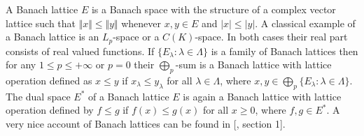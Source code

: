 A Banach lattice $E$ is a Banach space with the structure of a complex vector
lattice such that $\Vert x\Vert\leq \Vert y\Vert$ whenever $x, y\in E$ 
and $|x|\leq |y|$. A classical example of a Banach lattice is an $L_p$-space 
or a $C(K)$-space. In both cases their real part consists of real 
valued functions. If $ \{E_\lambda:\lambda\in\Lambda \}$ is a family 
of Banach lattices then for any $1\leq p\leq +\infty$ or $p=0$ 
their $\bigoplus_p$-sum is a Banach lattice with lattice operation defined 
as $x\leq y$ if $x_\lambda\leq y_\lambda$ for all $\lambda\in\Lambda$, where 
$x,y\in\bigoplus_p \{ E_\lambda:\lambda\in\Lambda \}$. 
The dual space $E^*$ of a Banach lattice $E$ is again a Banach lattice with
lattice operation defined by $f\leq g$ if $f(x)\leq g(x)$ for all $x\geq 0$,
where $f,g\in  E^*$. A very nice account of Banach lattices can be found in
[\cite{LaceyIsomThOfClassicBanSp}, section 1].

